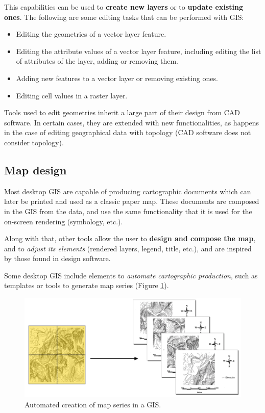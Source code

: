 This capabilities can be used to \textbf{create new layers} or to \textbf{update existing ones}. The following are some editing tasks that can be performed with GIS:

\begin{itemize}
\item Editing the geometries of a vector layer feature.
\item Editing the attribute values of a vector layer feature, including editing the list of attributes of the layer, adding or removing them.
\item Adding new features to a vector layer or removing existing ones.
\item Editing cell values in a raster layer.
\end{itemize}

Tools used to edit geometries inherit a large part of their design from CAD software. In certain cases, they are extended with new functionalities, as happens in the case of editing geographical data with topology (CAD software does not consider topology).


\subsection{Map design}

Most desktop GIS are capable of producing cartographic documents which can later be printed and used as a classic paper map. These documents are composed in the GIS from the data, and use the same functionality that it is used for the on-screen rendering (symbology, etc.).

Along with that, other tools allow the user to \textbf{design and compose the map}, and to \emph{adjust its elements} (rendered layers, legend, title, etc.), and are inspired by those found in design software. 

Some desktop GIS include elements to \emph{automate cartographic production}, such as templates or tools to generate map series (Figure \ref{Fig:Map_series}).

\begin{figure}[!hbt]
\centering
\includegraphics[width=\textwidth]{Software/Map_series.png}
\caption{\small Automated creation of map series in a GIS.}
\label{Fig:Map_series} 
\end{figure}

